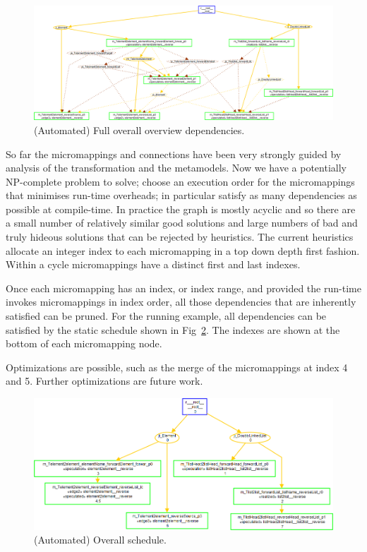 \documentclass{llncs}
\begin{document}
\begin{figure}[h]
	\centering
	\includegraphics[width=1.0\textwidth]{QVTsDependencies.png}
	\caption{(Automated) Full overall overview dependencies.}
	\label{fig:QVTsFullDependencies}
\end{figure}

So far the micromappings and connections have been very strongly guided by analysis of the transformation and the metamodels. Now we have a potentially NP-complete problem to solve; choose an execution order for the micromappings that minimises run-time overheads; in particular satisfy as many dependencies as possible at compile-time. In practice the graph is mostly acyclic and so there are a small number of relatively similar good solutions and large numbers of bad and truly hideous solutions that can be rejected by heuristics. The current heuristics allocate an integer index to each micromapping in a top down depth first fashion. Within a cycle micromappings have a distinct first and last indexes.

Once each micromapping has an index, or index range, and provided the run-time invokes micromappings in index order, all those dependencies that are inherently satisfied can be pruned. For the running example, all dependencies can be satisfied by the static schedule shown in Fig~\ref{fig:QVTsSchedule}. The indexes are shown at the bottom of each micromapping node.

Optimizations are possible, such as the merge of the micromappings at index 4 and 5. Further optimizations are future work.

\begin{figure}[h]
	\centering
	\includegraphics[width=1.0\textwidth]{QVTsSchedule.png}
	\caption{(Automated) Overall schedule.}
	\label{fig:QVTsSchedule}
\end{figure}
\end{document}
